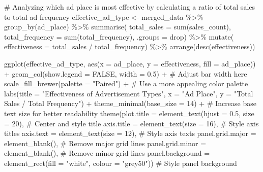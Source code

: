 \documentclass[
  letterpaper,
  DIV=11,
  numbers=noendperiod]{scrartcl}
\newenvironment{Shaded}{\begin{snugshade}}{\end{snugshade}}
\newcommand{\AttributeTok}[1]{\textcolor[rgb]{0.40,0.45,0.13}{#1}}
\newcommand{\CommentTok}[1]{\textcolor[rgb]{0.37,0.37,0.37}{#1}}
\newcommand{\ConstantTok}[1]{\textcolor[rgb]{0.56,0.35,0.01}{#1}}
\newcommand{\DecValTok}[1]{\textcolor[rgb]{0.68,0.00,0.00}{#1}}
\newcommand{\FloatTok}[1]{\textcolor[rgb]{0.68,0.00,0.00}{#1}}
\newcommand{\FunctionTok}[1]{\textcolor[rgb]{0.28,0.35,0.67}{#1}}
\newcommand{\NormalTok}[1]{\textcolor[rgb]{0.00,0.23,0.31}{#1}}
\newcommand{\OtherTok}[1]{\textcolor[rgb]{0.00,0.23,0.31}{#1}}
\newcommand{\SpecialCharTok}[1]{\textcolor[rgb]{0.37,0.37,0.37}{#1}}
\newcommand{\StringTok}[1]{\textcolor[rgb]{0.13,0.47,0.30}{#1}}
\begin{document}
\begin{Shaded}
\begin{Highlighting}[]
\CommentTok{\# Analyzing which ad place is most effective by calculating a ratio of total sales to total ad frequency}
\NormalTok{effective\_ad\_type }\OtherTok{\textless{}{-}}\NormalTok{ merged\_data }\SpecialCharTok{\%\textgreater{}\%}
  \FunctionTok{group\_by}\NormalTok{(ad\_place) }\SpecialCharTok{\%\textgreater{}\%}
  \FunctionTok{summarise}\NormalTok{( }\AttributeTok{total\_sales =} \FunctionTok{sum}\NormalTok{(sales\_count), }
             \AttributeTok{total\_frequency =} \FunctionTok{sum}\NormalTok{(total\_frequency), }\AttributeTok{.groups =} \StringTok{\textquotesingle{}drop\textquotesingle{}}\NormalTok{) }\SpecialCharTok{\%\textgreater{}\%}
  \FunctionTok{mutate}\NormalTok{( }\AttributeTok{effectiveness =}\NormalTok{ total\_sales }\SpecialCharTok{/}\NormalTok{ total\_frequency) }\SpecialCharTok{\%\textgreater{}\%}
  \FunctionTok{arrange}\NormalTok{(}\FunctionTok{desc}\NormalTok{(effectiveness))}




\FunctionTok{ggplot}\NormalTok{(effective\_ad\_type, }\FunctionTok{aes}\NormalTok{(}\AttributeTok{x =}\NormalTok{ ad\_place, }\AttributeTok{y =}\NormalTok{ effectiveness, }\AttributeTok{fill =}\NormalTok{ ad\_place)) }\SpecialCharTok{+}
  \FunctionTok{geom\_col}\NormalTok{(}\AttributeTok{show.legend =} \ConstantTok{FALSE}\NormalTok{, }\AttributeTok{width =} \FloatTok{0.5}\NormalTok{) }\SpecialCharTok{+} \CommentTok{\# Adjust bar width here}
  \FunctionTok{scale\_fill\_brewer}\NormalTok{(}\AttributeTok{palette =} \StringTok{"Paired"}\NormalTok{) }\SpecialCharTok{+} \CommentTok{\# Use a more appealing color palette}
  \FunctionTok{labs}\NormalTok{(}\AttributeTok{title =} \StringTok{"Effectiveness of Advertisement Types"}\NormalTok{, }
       \AttributeTok{x =} \StringTok{"Ad Place"}\NormalTok{, }
       \AttributeTok{y =} \StringTok{"Total Sales / Total Frequency"}\NormalTok{) }\SpecialCharTok{+}
  \FunctionTok{theme\_minimal}\NormalTok{(}\AttributeTok{base\_size =} \DecValTok{14}\NormalTok{) }\SpecialCharTok{+} \CommentTok{\# Increase base text size for better readability}
  \FunctionTok{theme}\NormalTok{(}\AttributeTok{plot.title =} \FunctionTok{element\_text}\NormalTok{(}\AttributeTok{hjust =} \FloatTok{0.5}\NormalTok{, }\AttributeTok{size =} \DecValTok{20}\NormalTok{), }\CommentTok{\# Center and style title}
        \AttributeTok{axis.title =} \FunctionTok{element\_text}\NormalTok{(}\AttributeTok{size =} \DecValTok{16}\NormalTok{), }\CommentTok{\# Style axis titles}
        \AttributeTok{axis.text =} \FunctionTok{element\_text}\NormalTok{(}\AttributeTok{size =} \DecValTok{12}\NormalTok{), }\CommentTok{\# Style axis texts}
        \AttributeTok{panel.grid.major =} \FunctionTok{element\_blank}\NormalTok{(), }\CommentTok{\# Remove major grid lines}
        \AttributeTok{panel.grid.minor =} \FunctionTok{element\_blank}\NormalTok{(), }\CommentTok{\# Remove minor grid lines}
        \AttributeTok{panel.background =} \FunctionTok{element\_rect}\NormalTok{(}\AttributeTok{fill =} \StringTok{"white"}\NormalTok{, }\AttributeTok{colour =} \StringTok{"grey50"}\NormalTok{)) }\CommentTok{\# Style panel background}
\end{Highlighting}
\end{Shaded}
\end{document}
